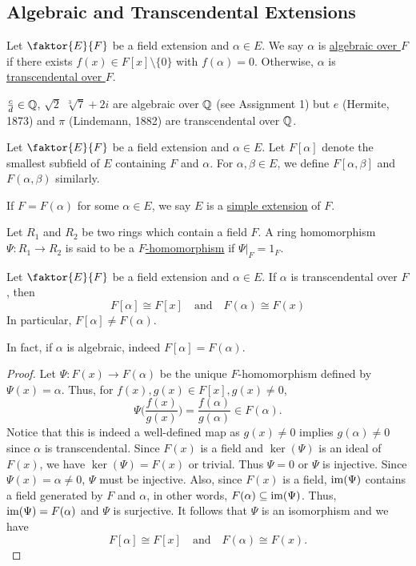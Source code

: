 \documentclass[11pt]{article}
\newcommand{\quotient}[2]{\faktor{#1}{#2}}
\begin{document}
\subsection{Algebraic and Transcendental Extensions}
\begin{definition}
Let $\quotient{E}{F}$ be a field extension and $\alpha \in E$. We say $\alpha$
is \underline{algebraic over $F$} if there exists $f(x) \in F[x]\setminus \{0\}$
with $f(\alpha) = 0$. Otherwise, $\alpha$ is \underline{transcendental over
$F$}.
\end{definition}
\begin{example}
$\frac{c}{d} \in \mathbb{Q}$, $\sqrt 2$ $\sqrt[3]{7} + 2i$ are algebraic over $\mathbb{Q}$
(see Assignment 1) but $e$ (Hermite, 1873) and $\pi$ (Lindemann, 1882) are
transcendental over $\mathbb{Q}$.
\end{example}
Let $\quotient{E}{F}$ be a field extension and $\alpha \in E$. Let $F[\alpha]$
denote the smallest subfield of $E$ containing $F$ and $\alpha$. For $\alpha,
\beta \in E$, we define $F[\alpha, \beta]$ and $F(\alpha, \beta)$ similarly.
\begin{definition}
If $F = F(\alpha)$ for some $\alpha \in E$, we say $E$ is a \underline{simple
extension} of $F$.
\end{definition}
\begin{definition}
Let $R_1$ and $R_2$ be two rings which contain a field $F$. A ring homomorphism
$\Psi: R_1 \to R_2$ is said to be a \underline{$F$-homomorphism} if $\Psi|_F =
1_F$.
\end{definition}
\begin{theorem} \label{theorem2}
Let $\quotient{E}{F}$ be a field extension and $\alpha \in E$. If $\alpha$ is
transcendental over $F$, then
\begin{equation*}
F[\alpha] \cong F[x] \quad \text{and} \quad F(\alpha) \cong F(x)
\end{equation*}
In particular, $F[\alpha] \neq F(\alpha)$.
\end{theorem}
\begin{remark}
In fact, if $\alpha$ is algebraic, indeed $F[\alpha] = F(\alpha)$.
\end{remark}
\begin{proof}
Let $\Psi:F(x) \to F(\alpha)$ be the unique $F$-homomorphism defined by $\Psi(x)
= \alpha$. Thus, for $f(x), g(x) \in F[x], g(x) \neq 0$, 
$$\Psi\bigg(\frac{f(x)}{g(x)}\bigg) = \frac{f(\alpha)}{g(\alpha)} \in
F(\alpha).$$ 
Notice that this is indeed a well-defined map as $g(x) \neq 0$ implies
$g(\alpha) \neq 0$ since $\alpha$ is transcendental. Since $F(x)$ is a field and
$\ker(\Psi)$ is an ideal of $F(x)$, we have $\ker(\Psi) = F(x)$ or trivial. Thus
$\Psi = 0$ or $\Psi$ is injective. Since $\Psi(x) = \alpha \neq 0$, $\Psi$ must
be injective. Also, since $F(x)$ is a field, $\operatorname{im}(\Psi)$ contains a field
generated by $F$ and $\alpha$, in other words, $F(\alpha) \subseteq \operatorname{im}(\Psi)$.
Thus, $\operatorname{im}(\Psi) = F(\alpha)$ and $\Psi$ is surjective. It follows that
$\Psi$ is an isomorphism and we have
\begin{equation*}
F[\alpha] \cong F[x] \quad \text{and} \quad F(\alpha) \cong F(x).
\end{equation*}
\end{proof}
\end{document}
